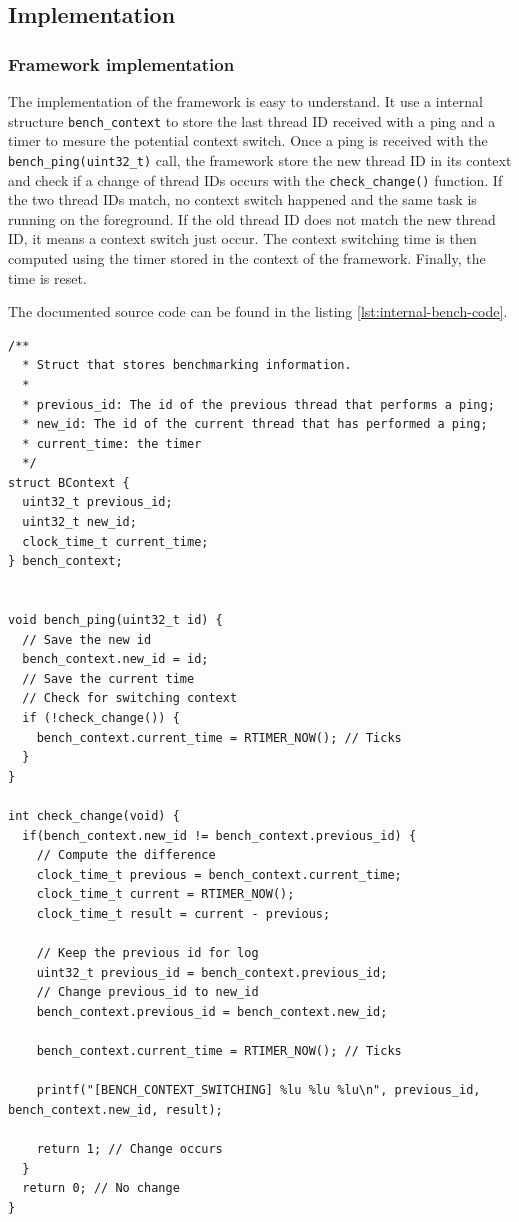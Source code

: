 \subsection{Implementation}

\subsubsection{Framework implementation}
The implementation of the framework is easy to understand.
It use a internal structure \texttt{bench\_context} to store the last thread ID received with a ping and a timer to mesure the potential context switch.
Once a ping is received with the \texttt{bench\_ping(uint32\_t)} call, the framework store the new thread ID in its context and check if a change of thread IDs occurs with the \texttt{check\_change()} function.
If the two thread IDs match, no context switch happened and the same task is running on the foreground.
If the old thread ID does not match the new thread ID, it means a context switch just occur.
The context switching time is then computed using the timer stored in the context of the framework.
Finally, the time is reset.

The documented source code can be found in the listing \ref{lst:internal-bench-code}.

\begin{lstlisting}[float, style=CStyle, label={lst:internal-bench-code}, caption={Source code of the benchmarking framework implemented in Contiki}]
/**
  * Struct that stores benchmarking information.
  * 
  * previous_id: The id of the previous thread that performs a ping;
  * new_id: The id of the current thread that has performed a ping;
  * current_time: the timer
  */
struct BContext {
  uint32_t previous_id;
  uint32_t new_id;
  clock_time_t current_time;
} bench_context;


void bench_ping(uint32_t id) {
  // Save the new id
  bench_context.new_id = id;
  // Save the current time
  // Check for switching context
  if (!check_change()) {
    bench_context.current_time = RTIMER_NOW(); // Ticks
  }
}

int check_change(void) {
  if(bench_context.new_id != bench_context.previous_id) {
    // Compute the difference
    clock_time_t previous = bench_context.current_time;
    clock_time_t current = RTIMER_NOW();
    clock_time_t result = current - previous;

    // Keep the previous id for log
    uint32_t previous_id = bench_context.previous_id;
    // Change previous_id to new_id
    bench_context.previous_id = bench_context.new_id;

    bench_context.current_time = RTIMER_NOW(); // Ticks

    printf("[BENCH_CONTEXT_SWITCHING] %lu %lu %lu\n", previous_id, bench_context.new_id, result);
    
    return 1; // Change occurs
  }
  return 0; // No change
}
\end{lstlisting}

